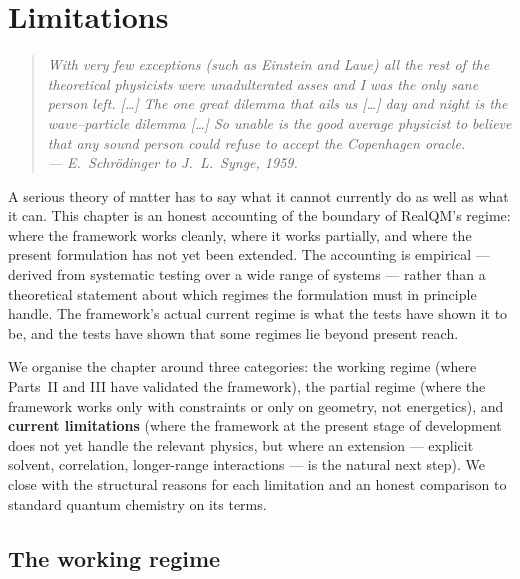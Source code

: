 \chapter{Limitations}\label{ch:limits}

\begin{quote}
\itshape With very few exceptions (such as Einstein and Laue) all the rest of the theoretical physicists were unadulterated asses and I was the only sane person left. [\ldots] The one great dilemma that ails us [\ldots] day and night is the wave--particle dilemma [\ldots] So unable is the good average physicist to believe that any sound person could refuse to accept the Copenhagen oracle.\\
\normalfont\hfill --- E.~Schr\"odinger to J.~L.~Synge, 1959.
\end{quote}
\bigskip

A serious theory of matter has to say what it cannot currently do as well as what it can. This chapter is an honest accounting of the boundary of RealQM's regime: where the framework works cleanly, where it works partially, and where the present formulation has not yet been extended. The accounting is empirical --- derived from systematic testing over a wide range of systems --- rather than a theoretical statement about which regimes the formulation must in principle handle. The framework's actual current regime is what the tests have shown it to be, and the tests have shown that some regimes lie beyond present reach.

We organise the chapter around three categories: the working regime (where Parts~II and III have validated the framework), the partial regime (where the framework works only with constraints or only on geometry, not energetics), and \textbf{current limitations} (where the framework at the present stage of development does not yet handle the relevant physics, but where an extension --- explicit solvent, correlation, longer-range interactions --- is the natural next step). We close with the structural reasons for each limitation and an honest comparison to standard quantum chemistry on its terms.

\section{The working regime}\label{sec:working-regime}

